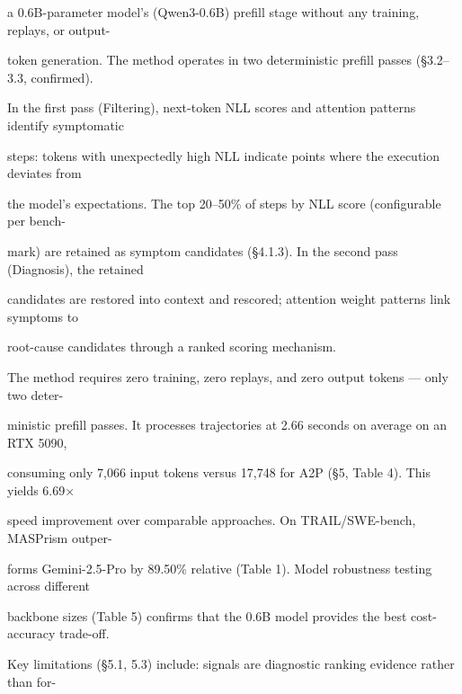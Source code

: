 \begin{flushleft}
\noindent a 0.6B-parameter model’s (Qwen3-0.6B) prefill stage without any training, replays, or output-\par
\noindent token generation. The method operates in two deterministic prefill passes (§3.2–3.3, confirmed).\par
\noindent In the first pass (Filtering), next-token NLL scores and attention patterns identify symptomatic\par
\noindent steps: tokens with unexpectedly high NLL indicate points where the execution deviates from\par
\noindent the model’s expectations. The top 20–50\% of steps by NLL score (configurable per bench-\par
\noindent mark) are retained as symptom candidates (§4.1.3). In the second pass (Diagnosis), the retained\par
\noindent candidates are restored into context and rescored; attention weight patterns link symptoms to\par
\noindent root-cause candidates through a ranked scoring mechanism.\par
\noindent  The method requires zero training, zero replays, and zero output tokens — only two deter-\par
\noindent ministic prefill passes. It processes trajectories at 2.66 seconds on average on an RTX 5090,\par
\noindent consuming only 7,066 input tokens versus 17,748 for A2P (§5, Table 4). This yields 6.69×\par
\noindent speed improvement over comparable approaches. On TRAIL/SWE-bench, MASPrism outper-\par
\noindent forms Gemini-2.5-Pro by 89.50\% relative (Table 1). Model robustness testing across different\par
\noindent backbone sizes (Table 5) confirms that the 0.6B model provides the best cost-accuracy trade-off.\par
\noindent  Key limitations (§5.1, 5.3) include: signals are diagnostic ranking evidence rather than for-\par
\end{flushleft}
